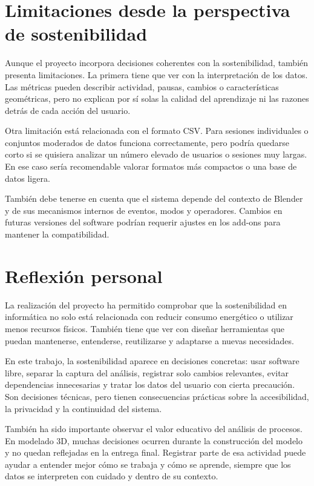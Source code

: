 \section{Limitaciones desde la perspectiva de sostenibilidad}

Aunque el proyecto incorpora decisiones coherentes con la sostenibilidad, también presenta limitaciones. La primera tiene que ver con la interpretación de los datos. Las métricas pueden describir actividad, pausas, cambios o características geométricas, pero no explican por sí solas la calidad del aprendizaje ni las razones detrás de cada acción del usuario.

Otra limitación está relacionada con el formato CSV. Para sesiones individuales o conjuntos moderados de datos funciona correctamente, pero podría quedarse corto si se quisiera analizar un número elevado de usuarios o sesiones muy largas. En ese caso sería recomendable valorar formatos más compactos o una base de datos ligera.

También debe tenerse en cuenta que el sistema depende del contexto de Blender y de sus mecanismos internos de eventos, modos y operadores. Cambios en futuras versiones del software podrían requerir ajustes en los add-ons para mantener la compatibilidad.

\section{Reflexión personal}

La realización del proyecto ha permitido comprobar que la sostenibilidad en informática no solo está relacionada con reducir consumo energético o utilizar menos recursos físicos. También tiene que ver con diseñar herramientas que puedan mantenerse, entenderse, reutilizarse y adaptarse a nuevas necesidades.

En este trabajo, la sostenibilidad aparece en decisiones concretas: usar software libre, separar la captura del análisis, registrar solo cambios relevantes, evitar dependencias innecesarias y tratar los datos del usuario con cierta precaución. Son decisiones técnicas, pero tienen consecuencias prácticas sobre la accesibilidad, la privacidad y la continuidad del sistema.

También ha sido importante observar el valor educativo del análisis de procesos. En modelado 3D, muchas decisiones ocurren durante la construcción del modelo y no quedan reflejadas en la entrega final. Registrar parte de esa actividad puede ayudar a entender mejor cómo se trabaja y cómo se aprende, siempre que los datos se interpreten con cuidado y dentro de su contexto.

